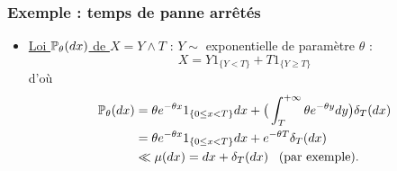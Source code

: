 %
%
%
\begin{frame}
\frametitle{Exemple : temps de panne \og arrêtés\fg{}}
\begin{itemize}
\item \underline{Loi $\operatorname{{\mathbb P}}_\theta(dx)$ de $X = Y \wedge T$} : $Y \sim$ exponentielle de paramètre $\theta$ :
$$\boxed{X = Y 1_{\{Y < T\}} + T 1_{\{Y \geq T\}}}$$
d'où
\begin{align*}\operatorname{{\mathbb P}}_\theta(dx) &
= \theta e^{-\theta x} 1_{\{0 \leq x < T\}} dx+ \big(\int_{T}^{+\infty}\theta e^{-\theta y}dy\big) \delta_T(dx)\\
&= \theta e^{-\theta x} 1_{\{0 \leq x < T\}}dx + e^{-\theta T} \delta_T(dx) \\
&\ll \mu(dx) = dx + \delta_T(dx)\;\;\; \text{(par exemple)}.
\end{align*}
\end{itemize}
\end{frame}

